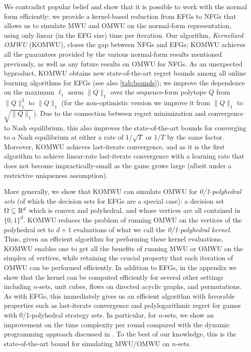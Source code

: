 We contradict popular belief and show that it is possible to work with the normal form efficiently: we provide a kernel-based reduction from EFGs to NFGs that allows us to simulate MWU and OMWU on the normal-form representation, using only linear (in the EFG size) time per iteration.
Our algorithm, \emph{Kernelized OMWU} (KOMWU), closes the gap between NFGs and EFGs; KOMWU achieves all the guarantees provided by the various normal-form results mentioned previously, as well as any future results on OMWU for NFGs.
As an unexpected byproduct, KOMWU obtains new state-of-the-art regret bounds among all online learning algorithms for EFGs (see also \cref{tab:bounds}); we improve the dependence on the maximum $\ell_1$ norm $\|Q\|_1$ over the sequence-form polytope $Q$ from $\|Q\|_1^2$ to $\|Q\|_1$ (for the non-optimistic version we improve it from $\|Q\|_1$ to $\sqrt{\|Q\|_1}$).
Due to the connection between regret minimization and convergence to Nash equilibrium, this also improves the state-of-the-art bounds for converging to a Nash equilibrium at either a rate of $1/\sqrt{T}$ or $1/T$ by the same factor.
Moreover, KOMWU achieves last-iterate convergence, and as it is the first algorithm to achieve linear-rate last-iterate convergence with a learning rate that does not become impractically-small as the game grows large (albeit under a restrictive uniqueness assumption).


More generally, we show that KOMWU can simulate OMWU for \emph{0/1-polyhedral sets} (of which the decision sets for EFGs are a special case):
a decision set $\Omega \subseteq {\mathbb{R}}^d$ which is convex and polyhedral, and whose vertices are all contained in $\{0,1\}^d$.
KOMWU reduces the problem of running OMWU on the vertices of the polyhedral set to $d+1$ evaluations of what we call the \emph{0/1-polyhedral kernel}.
Thus, given an efficient algorithm for performing these kernel evaluations, KOMWU enables one to get all the benefits of running MWU or OMWU on the simplex of vertices, while retaining the crucial property that each iteration of OMWU can be performed efficiently.
In addition to EFGs, in the appendix we show that the kernel can be computed efficiently for several other settings including $n$-sets, unit cubes, flows on directed acyclic graphs, and permutations.
As with EFGs, this immediately gives us an efficient algorithm with favorable properties such as last-iterate convergence and polylogarithmic regret for games with 0/1-polyhedral strategy sets.
In particular, for $n$-sets, we show an improvement on the time complexity per round compared with the dynamic programming approach discussed in \citep{Takimoto03:Path}.
To the best of our knowledge, this is the state-of-the-art bound for simulating MWU/OMWU on $n$-sets.


